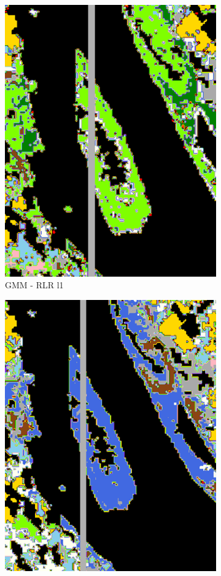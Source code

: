 \documentclass{siamart171218}
\begin{document}
\begin{figure}[h!]
        \begin{subfigure}[b]{0.25\textwidth}
                \centering
                \includegraphics[width=.85\linewidth]{images/Rejet_peintures_GMM_Log_reg_l1_T0.50_Ile.png}
                \caption{GMM - RLR l1}
                \label{fig:GMM_LRL1}
        \end{subfigure}%
        \begin{subfigure}[b]{0.25\textwidth}
                \centering
                \includegraphics[width=.85\linewidth]{images/Rejet_peintures_GMM_SVM_rbf_T0.50_Ile.png}

\end{subfigure}
\end{figure}
\end{document}
